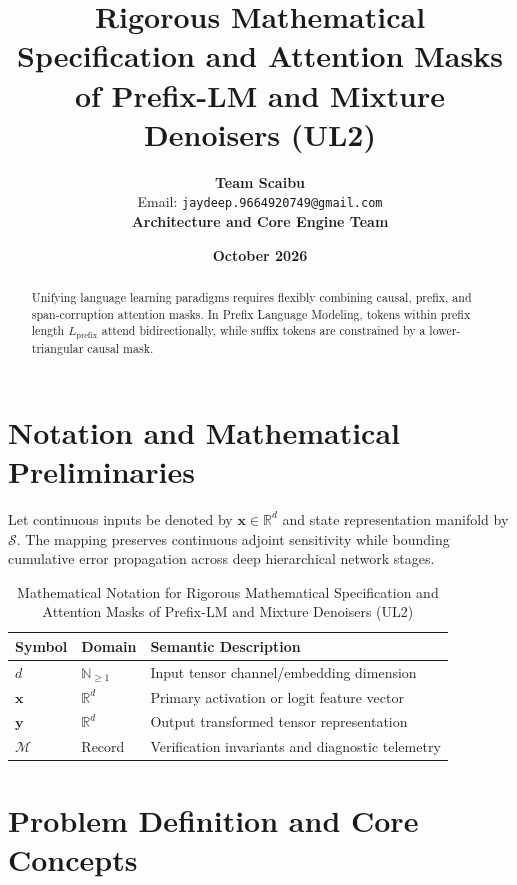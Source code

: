 \documentclass[11pt,a4paper]{article}
\title{\textbf{Rigorous Mathematical Specification and Attention Masks of Prefix-LM and Mixture Denoisers (UL2)}}
\author{\textbf{Team Scaibu} \\ \small Email: \texttt{jaydeep.9664920749@gmail.com} \\ \small \textbf{Architecture and Core Engine Team}}
\date{\textbf{October 2026}}
\theoremstyle{definition}
\begin{document}
\maketitle

\begin{abstract}
Unifying language learning paradigms requires flexibly combining causal, prefix, and span-corruption attention masks. In Prefix Language Modeling, tokens within prefix length $L_{\text{prefix}}$ attend bidirectionally, while suffix tokens are constrained by a lower-triangular causal mask.
\end{abstract}

\section{Notation and Mathematical Preliminaries}

Let continuous inputs be denoted by $\mathbf{x} \in \mathbb{R}^d$ and state representation manifold by $\mathcal{S}$. The mapping preserves continuous adjoint sensitivity while bounding cumulative error propagation across deep hierarchical network stages.

\begin{table}[h]
\centering
\caption{Mathematical Notation for Rigorous Mathematical Specification and Attention Masks of Prefix-LM and Mixture Denoisers (UL2)}
\begin{tabular}{lll}
\toprule
\textbf{Symbol} & \textbf{Domain} & \textbf{Semantic Description} \\
\midrule
$d$ & $\mathbb{N}_{\ge 1}$ & Input tensor channel/embedding dimension \\
$\mathbf{x}$ & $\mathbb{R}^d$ & Primary activation or logit feature vector \\
$\mathbf{y}$ & $\mathbb{R}^d$ & Output transformed tensor representation \\
$\mathcal{M}$ & Record & Verification invariants and diagnostic telemetry \\
\bottomrule
\end{tabular}
\end{table}

\section{Problem Definition and Core Concepts}
\end{document}
